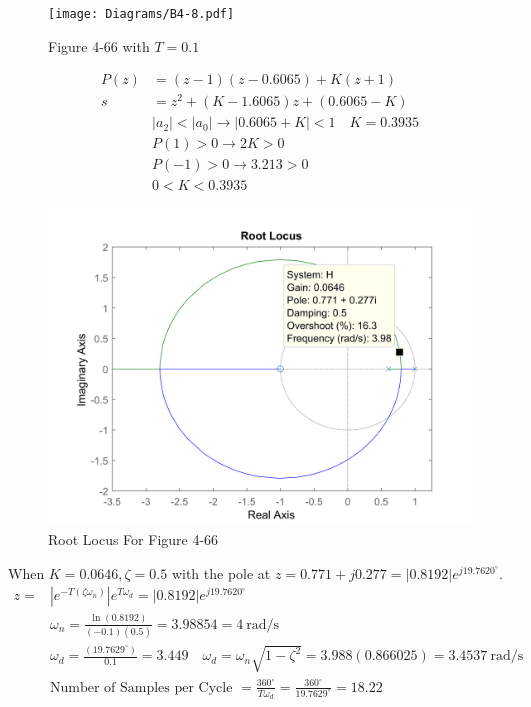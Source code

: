 {\begin{figure}[H]
	\centering
	\texttt{[image: Diagrams/B4-8.pdf]}
	\caption*{Figure 4-66 with $T=0.1$}
	\label{fig:samplerblock48}
\end{figure}
\vspace*{-1.05cm}
\begin{align*}
P(z)&=(z-1)(z-0.6065)+K(z+1) \\
    s&=z^2+(K-1.6065)z+(0.6065-K) \\
    & |a_2| < |a_0| \rightarrow |0.6065+K| < 1 \quad K =0.3935 \\
    & P(1) > 0 \rightarrow 2K > 0 \\
    & P(-1) > 0 \rightarrow 3.213 > 0 \\
    & 0 < K < 0.3935
\end{align*}

\begin{figure}[H]
	\centering
	\includegraphics[width=1\linewidth]{Diagrams/B-4-8Rlocus2.png}
	\caption*{Root Locus For Figure 4-66}
	\label{fig:Rlocus}
\end{figure}

When $K=0.0646, \zeta=0.5$ with the pole at $z=0.771+j0.277=|0.8192|e^{j19.7620^\circ}$. 
\begin{align*}
z=  & |e^{-T(\zeta \omega_n)} |e^{T \omega_d} = |0.8192|e^{j19.7620^\circ} \\
& \omega_n = \frac{\ln(0.8192)}{(-0.1)(0.5)}=3.98854 = 4 \ \text{rad/s} \\
& \omega_d = \frac{(19.7629^\circ)}{0.1} = 3.449 \quad  \omega_d = \omega_n \sqrt{1-\zeta^2}=3.988 (0.866025)=3.4537 \ \text{rad/s} \\
& \text{Number of Samples per Cycle } = \frac{360^\circ}{T\omega_d}=\frac{360^\circ}{19.7629^\circ}=18.22
\end{align*}


}
